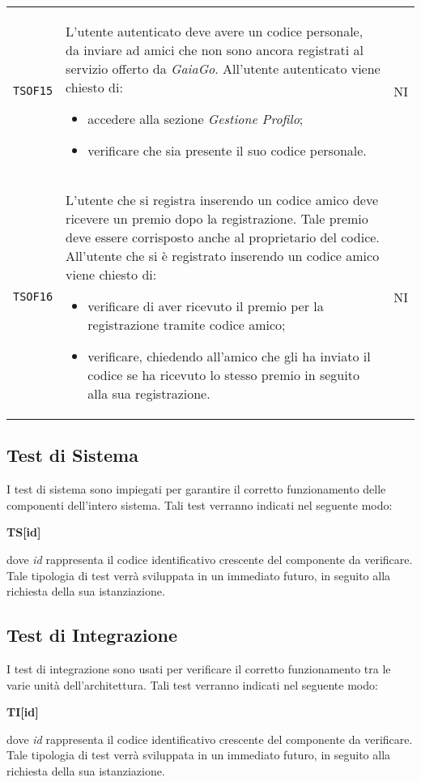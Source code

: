 \begin{longtable}{ >{\centering}p{} >{\centering}p{}
			>{\centering}p{}}
		 \texttt{TSOF15}	&	L'utente autenticato deve avere un codice personale, da inviare ad amici che non sono ancora registrati al servizio offerto da \textit{GaiaGo}.  All'utente autenticato viene chiesto di:
		 \begin{itemize}
		 	\item accedere alla sezione \textit{Gestione Profilo};
		 	\item verificare che sia presente il suo codice personale.
		 \end{itemize}	&	NI	\tabularnewline
		 \texttt{TSOF16}	&	L'utente che si registra inserendo un codice amico deve ricevere un premio dopo la registrazione. Tale premio deve essere corrisposto anche al proprietario del codice. All'utente che si è registrato inserendo un codice amico viene chiesto di:
		 \begin{itemize}
		 	\item verificare di aver ricevuto il premio per la registrazione tramite codice amico;
		 	\item verificare, chiedendo all'amico che gli ha inviato il codice se ha ricevuto lo stesso premio in seguito alla sua registrazione.
		 \end{itemize}	&	NI	\tabularnewline	
	\end{longtable}

\subsection{Test di Sistema}
I test di sistema sono impiegati per garantire il corretto funzionamento delle 
componenti dell'intero sistema. Tali test verranno indicati nel seguente modo:\\
	\centerline{\textbf{TS[id]}}
dove \textit{id} rappresenta il codice identificativo crescente del componente da
verificare.\\
Tale tipologia di test verrà sviluppata in un immediato futuro, in seguito alla richiesta della sua istanziazione.


\subsection{Test di Integrazione}
I test di integrazione sono usati per verificare il corretto funzionamento tra le
varie unità dell'architettura. Tali test verranno indicati nel seguente modo:\\
	\centerline{\textbf{TI[id]}}
dove \textit{id} rappresenta il codice identificativo crescente del componente da
verificare.\\
Tale tipologia di test verrà sviluppata in un immediato futuro, in seguito alla richiesta della sua istanziazione.

